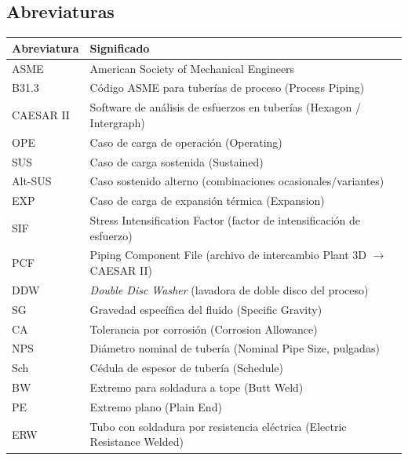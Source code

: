 \vspace{1cm}

\subsection*{Abreviaturas}

\noindent\begin{tabularx}{\textwidth}{@{}l>{\raggedright\arraybackslash}X@{}}
	\toprule
	\textbf{Abreviatura} & \textbf{Significado} \\
	\midrule
	ASME & American Society of Mechanical Engineers \\
	B31.3 & C\'{o}digo ASME para tuber\'{i}as de proceso (Process Piping) \\
	CAESAR II & Software de an\'{a}lisis de esfuerzos en tuber\'{i}as (Hexagon / Intergraph) \\
	OPE & Caso de carga de operaci\'{o}n (Operating) \\
	SUS & Caso de carga sostenida (Sustained) \\
	Alt-SUS & Caso sostenido alterno (combinaciones ocasionales/variantes) \\
	EXP & Caso de carga de expansi\'{o}n t\'{e}rmica (Expansion) \\
	SIF & Stress Intensification Factor (factor de intensificaci\'{o}n de esfuerzo) \\
	PCF & Piping Component File (archivo de intercambio Plant 3D $\rightarrow$ CAESAR II) \\
	DDW & \textit{Double Disc Washer} (lavadora de doble disco del proceso) \\
	SG & Gravedad espec\'{i}fica del fluido (Specific Gravity) \\
	CA & Tolerancia por corrosi\'{o}n (Corrosion Allowance) \\
	NPS & Di\'{a}metro nominal de tuber\'{i}a (Nominal Pipe Size, pulgadas) \\
	Sch & C\'{e}dula de espesor de tuber\'{i}a (Schedule) \\
	BW & Extremo para soldadura a tope (Butt Weld) \\
	PE & Extremo plano (Plain End) \\
	ERW & Tubo con soldadura por resistencia el\'{e}ctrica (Electric Resistance Welded) \\
	\bottomrule
\end{tabularx}

\newpage
